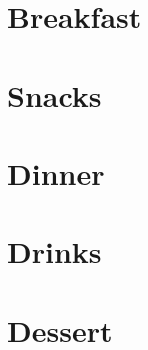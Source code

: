 \documentclass{book}
\begin{document}
\tableofcontents

\chapter{Breakfast}



\chapter{Snacks}



\chapter{Dinner}









\chapter{Drinks}



\chapter{Dessert}






\end{document}
